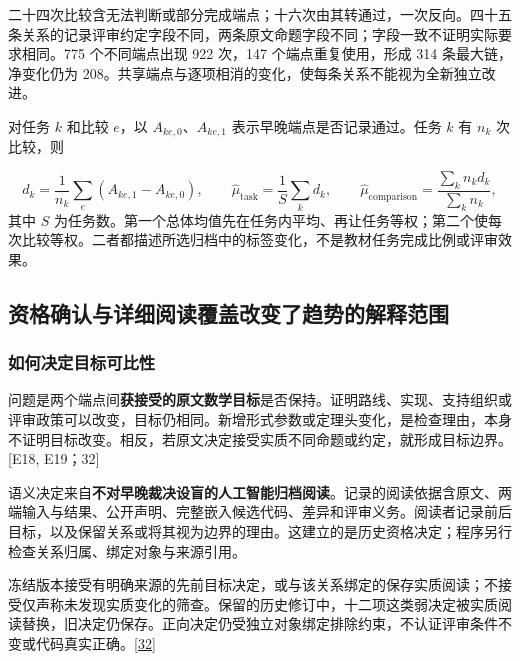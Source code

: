 二十四次比较含无法判断或部分完成端点；十六次由其转通过，一次反向。四十五条关系的记录评审约定字段不同，两条原文命题字段不同；字段一致不证明实际要求相同。775 个不同端点出现 922 次，147 个端点重复使用，形成 314 条最大链，净变化仍为 208。共享端点与逐项相消的变化，使每条关系不能视为全新独立改进。

对任务 $k$ 和比较 $e$，以 $A_{ke,0}$、$A_{ke,1}$ 表示早晚端点是否记录通过。任务 $k$ 有 $n_k$ 次比较，则

\[
d_k=\frac{1}{n_k}\sum_e(A_{ke,1}-A_{ke,0}),\qquad
\widehat\mu_{\mathrm{task}}=\frac1{S}\sum_k d_k,\qquad
\widehat\mu_{\mathrm{comparison}}=\frac{\sum_k n_kd_k}{\sum_k n_k},
\]
其中 $S$ 为任务数。第一个总体均值先在任务内平均、再让任务等权；第二个使每次比较等权。二者都描述所选归档中的标签变化，不是教材任务完成比例或评审效果。

\subsection[资格确认与详细阅读覆盖改变了趋势的解释范围]{\texorpdfstring{\protect\hypertarget{c4}{}资格确认与详细阅读覆盖改变了趋势的解释范围}{资格确认与详细阅读覆盖改变了趋势的解释范围}}
\subsubsection[如何决定目标可比性]{\texorpdfstring{\protect\hypertarget{c4-1}{}如何决定目标可比性}{如何决定目标可比性}}
问题是两个端点间\textbf{获接受的原文数学目标}是否保持。证明路线、实现、支持组织或评审政策可以改变，目标仍相同。新增形式参数或定理头变化，是检查理由，本身不证明目标改变。相反，若原文决定接受实质不同命题或约定，就形成目标边界。[E18, E19；32]

语义决定来自\textbf{不对早晚裁决设盲的人工智能归档阅读}。记录的阅读依据含原文、两端输入与结果、公开声明、完整嵌入候选代码、差异和评审义务。阅读者记录前后目标，以及保留关系或将其视为边界的理由。这建立的是历史资格决定；程序另行检查关系归属、绑定对象与来源引用。

冻结版本接受有明确来源的先前目标决定，或与该关系绑定的保存实质阅读；不接受仅声称未发现实质变化的筛查。保留的历史修订中，十二项这类弱决定被实质阅读替换，旧决定仍保存。正向决定仍受独立对象绑定排除约束，不认证评审条件不变或代码真实正确。\href{zh.pdf\#ref-32}{\mbox{[32]}}

